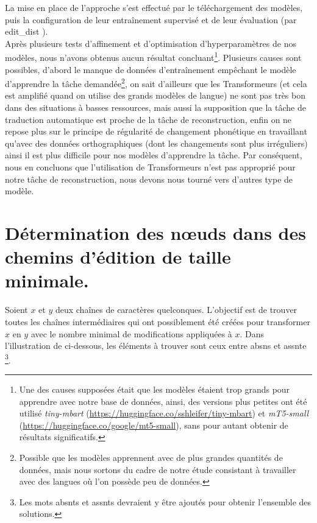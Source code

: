 \documentclass[12pt, twoside]{report}
\begin{document}
\indent La mise en place de l'approche s'est effectué par le téléchargement des modèles, puis la configuration de leur entraînement supervisé et de leur évaluation (par \gls{edit_dist} \autocite{levenshtein}).\\
\indent Après plusieurs tests d'affinement et d'optimisation d'hyperparamètres de nos modèles, nous n'avons obtenus aucun résultat concluant\footnote{Une des causes supposées était que les modèles étaient trop grands pour apprendre avec notre base de données, ainsi, des versions plus petites ont été utilisé \textit{tiny-mbart} (\url{https://huggingface.co/sshleifer/tiny-mbart}) et \textit{mT5-small} (\url{https://huggingface.co/google/mt5-small}), sans pour autant obtenir de résultats significatifs.}. Plusieurs causes sont possibles, d'abord le manque de données d'entraînement empêchant le modèle d'apprendre la tâche demandée\footnote{Possible que les modèles apprennent avec de plus grandes quantités de données, mais nous sortons du cadre de notre étude consistant à travailler avec des langues où l'on possède peu de données.}, on sait d'ailleurs que les Transformeurs (et cela est amplifié quand on utilise des grands modèles de langue) ne sont pas très bon dans des situations à basses ressources, mais aussi la supposition que la tâche de traduction automatique est proche de la tâche de reconstruction, enfin on ne repose plus sur le principe de régularité de changement phonétique en travaillant qu'avec des données orthographiques (dont les changements sont plus irréguliers) ainsi il est plus difficile pour nos modèles d'apprendre la tâche. Par conséquent, nous en concluons que l'utilisation de Transformeurs n'est pas approprié pour notre tâche de reconstruction, nous devons nous tourné vers d'autres type de modèle.

\chapter{Détermination des n\oe{}uds dans des chemins d'édition de taille minimale.} \label{deter-candidats}

Soient $x$ et $y$ deux chaînes de caractères quelconques. L'objectif est de trouver toutes les chaînes intermédiaires qui ont possiblement été créées pour transformer $x$ en $y$ avec le nombre minimal de modifications appliquées à $x$. Dans l'illustration de \cite{he2022neural} ci-dessous, les éléments à trouver sont ceux entre \og{} abs\textepsilon{}ns \fg{} et \og{} ass\textepsilon{}nte \fg{}\footnote{Les mots \og{} abs\textepsilon{}nts\fg{} et \og{} ass\textepsilon{}nts\fg{} devraient y être ajoutés pour obtenir l'ensemble des solutions.}. 
\end{document}
